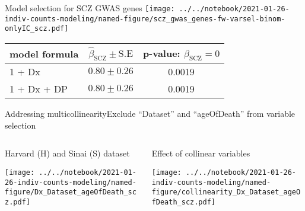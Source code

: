 \documentclass[usenames,dvipsnames]{beamer}
\begin{document}
\begin{frame}{Model selection for SCZ GWAS genes}
\small
\texttt{[image: ../../notebook/2021-01-26-indiv-counts-modeling/named-figure/scz\_gwas\_genes-fw-varsel-binom-onlyIC\_scz.pdf]}

\begin{center}
\tiny
\begin{tabular}{l|cc}
model formula & \(\hat{\beta}_\mathrm{SCZ} \pm \mathrm{S.E}\) & p-value: \(\beta_\mathrm{SCZ} = 0\) \\
\hline
1 + Dx & \(0.80 \pm 0.26\) & 0.0019 \\
1 + Dx + DP & \(0.80 \pm 0.26\) & 0.0019 \\
\end{tabular}
\end{center}
\end{frame}

\begin{frame}{Addressing multicollinearity}{Exclude ``Dataset'' and
		``ageOfDeath'' from variable selection}
\begin{columns}[t]
\begin{column}{0.5\textwidth}
\begin{center}
\small
Harvard (H) and Sinai (S) dataset

\texttt{[image: ../../notebook/2021-01-26-indiv-counts-modeling/named-figure/Dx\_Dataset\_ageOfDeath\_scz.pdf]}

\end{center}
\end{column}

\begin{column}{0.5\textwidth}
\begin{center}
\small
Effect of collinear variables

\texttt{[image: ../../notebook/2021-01-26-indiv-counts-modeling/named-figure/collinearity\_Dx\_Dataset\_ageOfDeath\_scz.pdf]}
\end{center}
\end{column}
\end{columns}
\end{frame}
\end{document}
